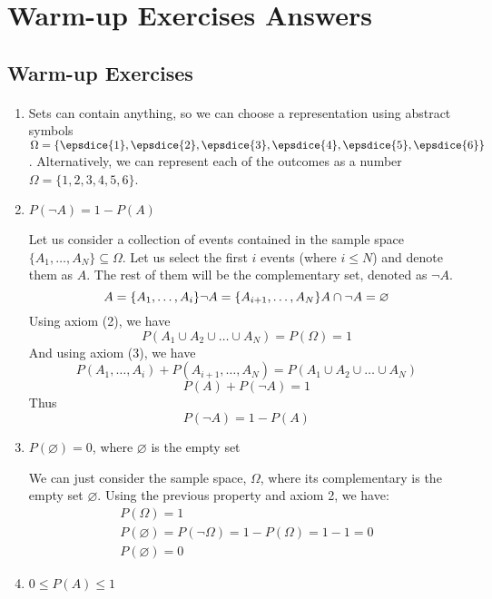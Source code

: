 \section{Warm-up Exercises Answers}
\subsection{Warm-up Exercises}
\paragraph{}
\begin{enumerate}[label=\alph*.]
    \item Sets can contain anything, so we can choose a representation using abstract symbols $\Omega=\{ \epsdice{1}, \epsdice{2}, \epsdice{3}, \epsdice{4}, \epsdice{5}, \epsdice{6} \}$. Alternatively, we can represent each of the outcomes as a number $\Omega = \{1, 2, 3, 4, 5, 6\}$. 
    \item $P(\neg  A) = 1 - P(A)$
    
Let us consider a collection of events contained in the sample space $\{A_1, \dots, A_{N}\} \subseteq \Omega$. Let us select the first $i$ events (where $i\leq N$) and denote them as $A$. The rest of them will be the complementary set, denoted as $\neg A$.
\[
A = \{A_1, \dots, A_i\}\\
\neg A = \{A_{i+1}, \dots, A_N\}\\
A\cap \neg A = \varnothing
\]
Using axiom (2), we have
\[
P(A_1\cup A_2 \cup \dots \cup A_N) = P(\Omega) = 1
\]
And using axiom (3), we have
\[
P(A_1, \dots, A_i) + P(A_{i+1}, \dots, A_N) = P(A_1\cup A_2 \cup \dots \cup A_N)
\]
\[
P(A) + P(\neg A) = 1
\]
Thus
\[
P(\neg A) = 1 - P(A) 
\]
    \item $P(\varnothing) = 0$, where $\varnothing$ is the empty set
    
We can just consider the sample space, $\Omega$, where its complementary is the empty set $\varnothing$. Using the previous property and axiom 2, we have:
\begin{gather}
P(\Omega) = 1 \\
 P(\varnothing)  = P(\neg \Omega) = 1 - P(\Omega) = 1 - 1 = 0 \\
 P(\varnothing) = 0
\end{gather}

    \item $0 \leq P(A) \leq 1$
    

\end{enumerate}
